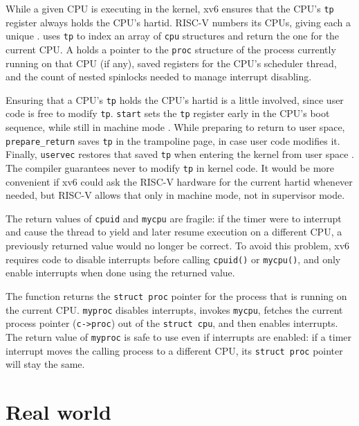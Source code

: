While a given CPU is executing in the kernel, xv6 ensures that the CPU's \lstinline{tp}
register always holds the CPU's hartid.
RISC-V numbers its CPUs, giving each
a unique .
uses \lstinline{tp} to index an array
of \lstinline{cpu} structures and return the one
for the current CPU.
A
holds a pointer to the \lstinline{proc}
structure of
the process currently running
on that CPU (if any),
saved registers for the CPU's scheduler thread,
and the count of nested spinlocks needed to manage
interrupt disabling.

Ensuring that a CPU's \lstinline{tp} holds the CPU's
hartid is a little involved, since user code is free
to modify \lstinline{tp}. \lstinline{start} sets the \lstinline{tp}
register early in the CPU's boot sequence, while still in machine mode
.
While preparing to return to user space,
\lstinline{prepare_return} saves \lstinline{tp} in the trampoline
page, in case user code modifies it.
Finally, \lstinline{uservec} restores that saved \lstinline{tp}
when entering the kernel from user space
.
The compiler guarantees never to modify \lstinline{tp}
in kernel code.
It would be more convenient if xv6 could ask the RISC-V
hardware for the current hartid whenever needed,
but RISC-V allows that only in
machine mode, not in supervisor mode.

The return values of
\lstinline{cpuid}
and
\lstinline{mycpu}
are fragile: if the timer were to interrupt and cause
the thread to yield and later resume execution on a different CPU,
a previously returned value would no longer be correct.
To avoid this problem, xv6 requires code to
disable interrupts before calling {\tt cpuid()} or {\tt mycpu()},
and only enable
interrupts when done using the returned value.

The function
returns the
\lstinline{struct proc}
pointer
for the process that is running on the current CPU.
\lstinline{myproc}
disables interrupts, invokes
\lstinline{mycpu},
fetches the current process pointer
(\lstinline{c->proc})
out of the
\lstinline{struct cpu},
and then enables interrupts.
The return value of
\lstinline{myproc}
is safe to use even if interrupts are enabled:
if a timer interrupt moves the calling process to a
different CPU, its
\lstinline{struct proc}
pointer will stay the same.


\section{Real world}

